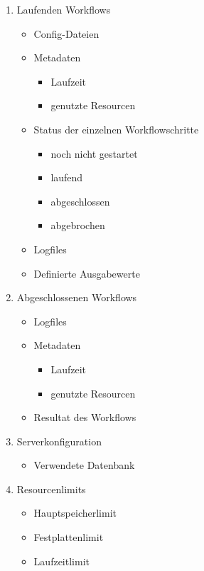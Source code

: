 \begin{enumerate}
    \item Laufenden Workflows
    \begin{itemize}
        \setlength\itemsep{-1em}
        \item Config-Dateien
        \item Metadaten
        \begin{itemize}
            \setlength\itemsep{-1em}
            \item Laufzeit
            \item genutzte Resourcen
        \end{itemize}
        \item Status der einzelnen Workflowschritte
        \begin{itemize}
            \setlength\itemsep{-1em}
            \item noch nicht gestartet
            \item laufend
            \item abgeschlossen
            \item abgebrochen
        \end{itemize}
        \item Logfiles
        \item Definierte Ausgabewerte
    \end{itemize}
    
    \item Abgeschlossenen Workflows
    \begin{itemize}
        \setlength\itemsep{-1em}
        \item Logfiles
        \item Metadaten
        \begin{itemize}
            \setlength\itemsep{-1em}
            \item Laufzeit
            \item genutzte Resourcen
        \end{itemize}
        \item Resultat des Workflows
    \end{itemize}
    
    \item Serverkonfiguration
    \begin{itemize}
        \setlength\itemsep{-1em}
        \item Verwendete Datenbank
    \end{itemize}
    
    \item Resourcenlimits
    \begin{itemize}
        \setlength\itemsep{-1em}
        \item Hauptspeicherlimit
        \item Festplattenlimit
        \item Laufzeitlimit
    \end{itemize}
 \end{enumerate}